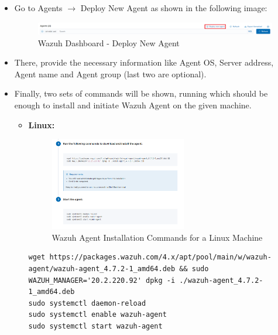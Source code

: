 \begin{itemize}
  \item Go to Agents \(\rightarrow\) Deploy New Agent as shown in the following image:
    \begin{figure}[H]
      \centering
      \includegraphics[width=\textwidth]{images/newagent-option.png}
      \caption{Wazuh Dashboard - Deploy New Agent}
    \end{figure}
  \item There, provide the necessary information like Agent OS, Server address, Agent name and Agent group (last two are optional).
  \item Finally, two sets of commands will be shown, running which should be enough to install and initiate Wazuh Agent on the given machine.
  \begin{itemize}
    \item \textbf{Linux:}
    \begin{figure}[H]
      \centering
      \includegraphics[width=0.6\textwidth]{images/wazuh-agent-commands-linux.png}
      \caption{Wazuh Agent Installation Commands for a Linux Machine}
    \end{figure}
    \begin{verbatim}
wget https://packages.wazuh.com/4.x/apt/pool/main/w/wazuh-agent/wazuh-agent_4.7.2-1_amd64.deb && sudo WAZUH_MANAGER='20.2.220.92' dpkg -i ./wazuh-agent_4.7.2-1_amd64.deb
sudo systemctl daemon-reload
sudo systemctl enable wazuh-agent
sudo systemctl start wazuh-agent
    \end{verbatim}


\end{itemize}
\end{itemize}
